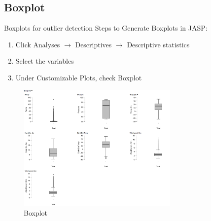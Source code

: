 \subsection*{Boxplot}

Boxplots for outlier detection Steps to Generate Boxplots in JASP:
\begin{enumerate}
    \item Click Analyses $\rightarrow$ Descriptives $\rightarrow$ Descriptive statistics
    \item Select the variables
    \item Under Customizable Plots, check Boxplot

\end{enumerate}

\begin{figure}[h]
\centering
\includegraphics[width=0.7\textwidth]{figures/boxplot.png}
\caption{Boxplot}
\end{figure}

\clearpage